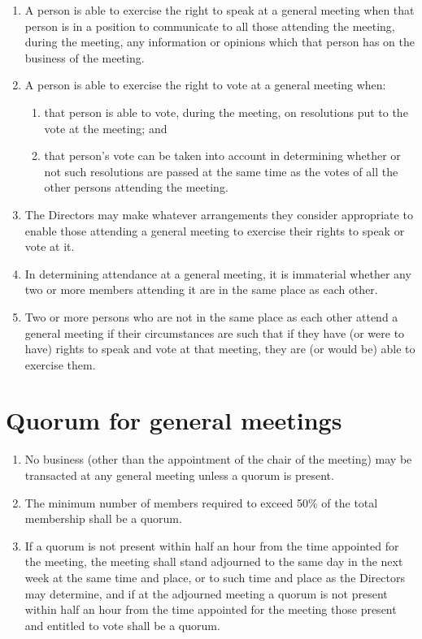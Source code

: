 \documentclass[a4paper,12pt]{article}
\begin{document}
\begin{enumerate}
  \item A person is able to exercise the right to speak at a general meeting when that person is in a position to communicate to all those attending the meeting, during the meeting, any information or opinions which that person has on the business of the meeting.
  \item A person is able to exercise the right to vote at a general meeting when:
  \begin{enumerate}
    \item that person is able to vote, during the meeting, on resolutions put to the vote at the meeting; and
    \item that person's vote can be taken into account in determining whether or not such resolutions are passed at the same time as the votes of all the other persons attending the meeting.
  \end{enumerate}
  \item The Directors may make whatever arrangements they consider appropriate to enable those attending a general meeting to exercise their rights to speak or vote at it.
  \item In determining attendance at a general meeting, it is immaterial whether any two or more members attending it are in the same place as each other.
  \item Two or more persons who are not in the same place as each other attend a general meeting if their circumstances are such that if they have (or were to have) rights to speak and vote at that meeting, they are (or would be) able to exercise them.
\end{enumerate}

\section{Quorum for general meetings}

\begin{enumerate}
  \item No business (other than the appointment of the chair of the meeting) may be transacted at any general meeting unless a quorum is present.
  \item The minimum number of members required to exceed 50\% of the total membership shall be a quorum. %
  \item If a quorum is not present within half an hour from the time appointed for the meeting, the meeting shall stand adjourned to the same day in the next week at the same time and place, or to such time and place as the Directors may determine, and if at the adjourned meeting a quorum is not present within half an hour from the time appointed for the meeting those present and entitled to vote shall be a quorum.
\end{enumerate}
\end{document}
